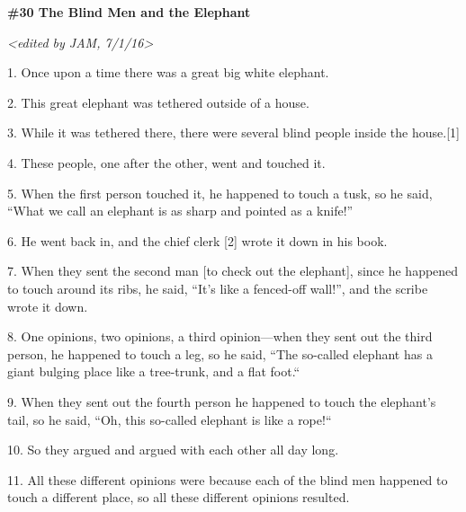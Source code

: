
{\textbf{\#30 The Blind Men and the Elephant}}

{\textit{<edited by JAM, 7/1/16>}}

{1. Once upon a time there was a great big white elephant.}

{2. This great elephant was tethered outside of a house.}

{3. While it was tethered there, there were several blind people inside
the house.[1]}

{4. These people, one after the other, went and touched it.}

{5. When the first person touched it, he happened to touch a tusk, so he
said, ``What we call an elephant is as sharp and pointed as a knife!''}

{6. He went back in, and the chief clerk [2] wrote it down in his book.}

{7. When they sent the second man [to check out the elephant], since he
happened to touch around its ribs, he said, ``It's like a fenced-off wall!'', and
the scribe wrote it down.}

{8. One opinions, two opinions, a third opinion---when they sent out the
third person, he happened to touch a leg, so he said, ``The so-called elephant
has a giant bulging place like a tree-trunk, and a flat foot.``}

{9. When they sent out the fourth person he happened to touch the elephant's
tail, so he said, ``Oh, this so-called elephant is like a rope!``
}

{10. So they argued and argued with each other all day long.}

{11. All these different opinions were because each of the blind men happened
to touch a different place, so all these different opinions resulted.}

